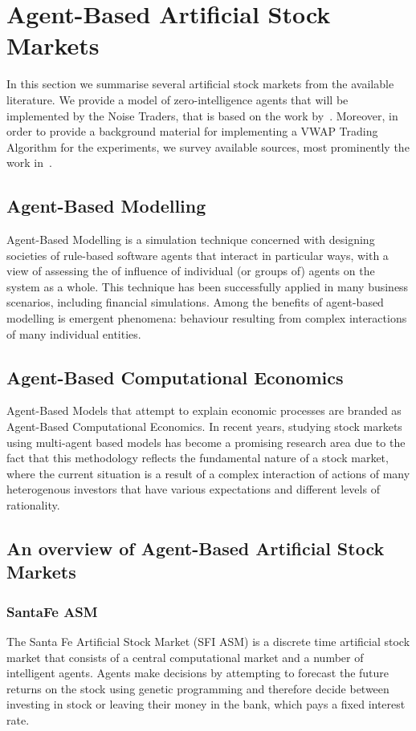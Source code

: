 \section{Agent-Based Artificial Stock Markets}
\label{Chapters/Background/Agent-Based-Modelling}

In this section we summarise several artificial stock markets from the available literature. We provide a model of zero-intelligence agents that will be implemented by the Noise Traders, that is based on the work by~\citet[chap.~4]{Gilles2006}. Moreover, in order to provide a background material for implementing a VWAP Trading Algorithm for the experiments, we survey available sources, most prominently the work in~\cite{Coggins2006, Kakade2004}. 

\subsection{Agent-Based Modelling}
Agent-Based Modelling is a simulation technique concerned with designing societies of rule-based software agents that interact in particular ways, with a view of assessing the of influence of individual (or groups of) agents on the system as a whole. This technique has been successfully applied in many business scenarios, including financial simulations. Among the benefits of agent-based modelling is emergent phenomena: behaviour resulting from complex interactions of many individual entities.

\subsection{Agent-Based Computational Economics}
Agent-Based Models that attempt to explain economic processes are branded as Agent-Based Computational Economics. In recent years, studying stock markets using multi-agent based models has become a promising research area due to the fact that this methodology reflects the fundamental nature of a stock market, where the current situation is a result of a complex interaction of actions of many heterogenous investors that have various expectations and different levels of rationality.

\subsection{An overview of Agent-Based Artificial Stock Markets}

\subsubsection*{SantaFe ASM~\citep{Lebaron2002, Lebaron99}}
The Santa Fe Artificial Stock Market (SFI ASM) is a discrete time artificial stock market that consists of a central computational market and a number of intelligent agents. Agents make decisions by attempting to forecast the future returns on the stock using genetic programming and therefore decide between investing in stock or leaving their money in the bank, which pays a fixed interest rate.

